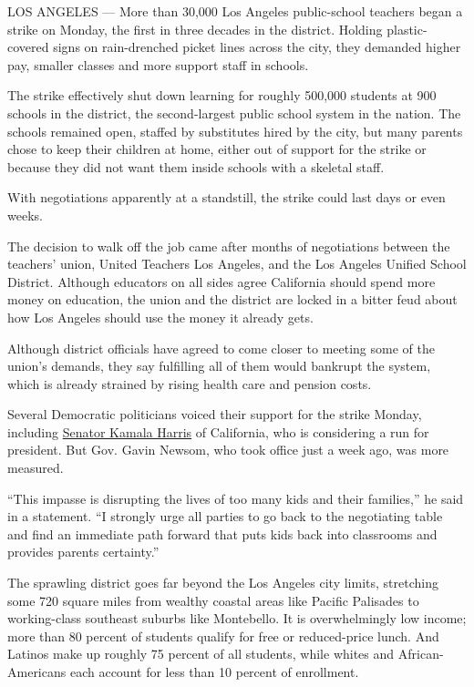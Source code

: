 LOS ANGELES --- More than 30,000 Los Angeles public-school teachers
began a strike on Monday, the first in three decades in the district.
Holding plastic-covered signs on rain-drenched picket lines across the
city, they demanded higher pay, smaller classes and more support staff
in schools.

The strike effectively shut down learning for roughly 500,000 students
at 900 schools in the district, the second-largest public school system
in the nation. The schools remained open, staffed by substitutes hired
by the city, but many parents chose to keep their children at home,
either out of support for the strike or because they did not want them
inside schools with a skeletal staff.

With negotiations apparently at a standstill, the strike could last days
or even weeks.

The decision to walk off the job came after months of negotiations
between the teachers' union, United Teachers Los Angeles, and the Los
Angeles Unified School District. Although educators on all sides agree
California should spend more money on education, the union and the
district are locked in a bitter feud about how Los Angeles should use
the money it already gets.

Although district officials have agreed to come closer to meeting some
of the union's demands, they say fulfilling all of them would bankrupt
the system, which is already strained by rising health care and pension
costs.

Several Democratic politicians voiced their support for the strike
Monday, including
\href{https://twitter.com/KamalaHarris/status/1084862005767557120}{Senator
Kamala Harris} of California, who is considering a run for president.
But Gov. Gavin Newsom, who took office just a week ago, was more
measured.

``This impasse is disrupting the lives of too many kids and their
families,'' he said in a statement. ``I strongly urge all parties to go
back to the negotiating table and find an immediate path forward that
puts kids back into classrooms and provides parents certainty.''

The sprawling district goes far beyond the Los Angeles city limits,
stretching some 720 square miles from wealthy coastal areas like Pacific
Palisades to working-class southeast suburbs like Montebello. It is
overwhelmingly low income; more than 80 percent of students qualify for
free or reduced-price lunch. And Latinos make up roughly 75 percent of
all students, while whites and African-Americans each account for less
than 10 percent of enrollment.

